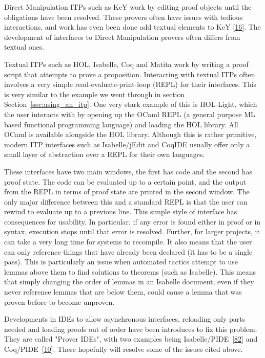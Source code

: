 \documentclass[
]{article}
\begin{document}
Direct Manipulation ITPs such as KeY work by editing proof objects until
the obligations have been resolved. These provers often have issues with
tedious interactions, and work has even been done add textual elements
to KeY {[}\protect\hyperlink{ref-beckert_interaction_2017}{16}{]}. The
development of interfaces to Direct Manipulation provers often differs
from textual ones.

Textual ITPs such as HOL, Isabelle, Coq and Matita work by writing a
proof script that attempts to prove a proposition. Interacting with
textual ITPs often involves a very simple read-evaluate-print-loop
(REPL) for their interfaces. This is very similar to the example we went
through in section Section~\ref{sec:using_an_itp}. One very stark
example of this is HOL-Light, which the user interacts with by opening
up the OCaml REPL (a general purpose ML based functional programming
language) and loading the HOL library. All OCaml is available alongside
the HOL library. Although this is rather primitive, modern ITP
interfaces such as Isabelle/jEdit and CoqIDE usually offer only a small
layer of abstraction over a REPL for their own languages.

These interfaces have two main windows, the first has code and the
second has proof state. The code can be evaluated up to a certain point,
and the output from the REPL in terms of proof state are printed in the
second window. The only major difference between this and a standard
REPL is that the user can rewind to evaluate up to a previous line. This
simple style of interface has consequences for usability. In particular,
if any error is found either in proof or in syntax, execution stops
until that error is resolved. Further, for larger projects, it can take
a very long time for systems to recompile. It also means that the user
can only reference things that have already been declared (it has to be
a single pass). This is particularly an issue when automated tactics
attempt to use lemmas above them to find solutions to theorems (such as
Isabelle). This means that simply changing the order of lemmas in an
Isabelle document, even if they never reference lemmas that are below
them, could cause a lemma that was proven before to become unproven.

Developments in IDEs to allow asynchronous interfaces, reloading only
parts needed and loading proofs out of order have been introduces to fix
this problem. They are called "Prover IDEs", with two examples being
Isabelle/PIDE~{[}\protect\hyperlink{ref-wenzel_asynchronous_2014}{82}{]}
and Coq/PIDE~{[}\protect\hyperlink{ref-barras_asynchronous_2015}{10}{]}.
These hopefully will resolve some of the issues cited above.
\end{document}
